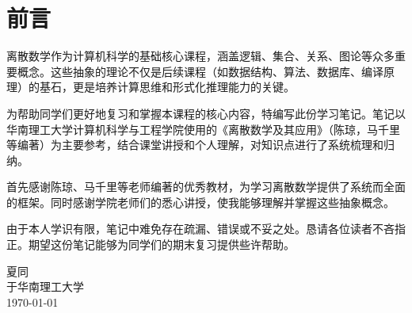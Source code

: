 \documentclass[12pt, a4paper, oneside,UTF8]{ctexbook}
\begin{document}


\frontmatter
\pagestyle{frontmatter}

\chapter*{前言}

离散数学作为计算机科学的基础核心课程，涵盖逻辑、集合、关系、图论等众多重要概念。这些抽象的理论不仅是后续课程（如数据结构、算法、数据库、编译原理）的基石，更是培养计算思维和形式化推理能力的关键。

为帮助同学们更好地复习和掌握本课程的核心内容，特编写此份学习笔记。笔记以华南理工大学计算机科学与工程学院使用的《离散数学及其应用》（陈琼，马千里等编著）为主要参考，结合课堂讲授和个人理解，对知识点进行了系统梳理和归纳。

首先感谢陈琼、马千里等老师编著的优秀教材，为学习离散数学提供了系统而全面的框架。同时感谢学院老师们的悉心讲授，使我能够理解并掌握这些抽象概念。

由于本人学识有限，笔记中难免存在疏漏、错误或不妥之处。恳请各位读者不吝指正。期望这份笔记能够为同学们的期末复习提供些许帮助。

\vspace{0.5cm}
\begin{flushright}
夏同\\
于华南理工大学\\
\today
\end{flushright}

\newpage
{}
\tableofcontents
\thispagestyle{tocmatter} 

\cleardoublepage
\pagestyle{indexmatter}
\makeenvindex
\cleardoublepage

\mainmatter
\pagestyle{mainmatter} %





\end{document}
